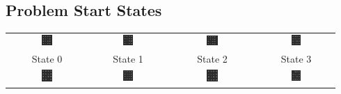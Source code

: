 \documentclass{article}
\begin{document}
	
	\newpage
	\begin{appendices}
		\section{Problem Start States}
		\label{appendix:start}
		
		\begin{center}
			\begin{tabular}{c c c c}
				\includegraphics[width=0.135\textwidth,keepaspectratio]{State-0.png} & \includegraphics[width=0.135\textwidth,keepaspectratio]{State-1.png} & \includegraphics[width=0.135\textwidth,keepaspectratio]{State-2.png} & \includegraphics[width=0.135\textwidth,keepaspectratio]{State-3.png} \\
				State 0 & State 1 & State 2 & State 3 \\
				\includegraphics[width=0.135\textwidth,keepaspectratio]{State-4.png} & \includegraphics[width=0.135\textwidth,keepaspectratio]{State-5.png} & \includegraphics[width=0.135\textwidth,keepaspectratio]{State-6.png} & \includegraphics[width=0.135\textwidth,keepaspectratio]{State-7.png} \\

\end{tabular}
\end{center}
\end{appendices}
\end{document}
